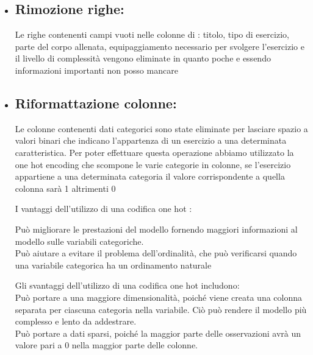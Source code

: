 \documentclass{book}
\begin{document}
\begin{itemize}
\item \subsection{ Rimozione righe:}\newline

Le righe contenenti campi vuoti nelle colonne di : titolo, tipo di esercizio, parte del corpo allenata, equipaggiamento necessario per svolgere l’esercizio e il livello di complessità vengono eliminate in quanto poche e essendo informazioni importanti non posso mancare\newline
\newpage
\item \subsection{ Riformattazione colonne:}\newline

Le colonne contenenti dati categorici sono state eliminate per lasciare spazio a valori binari che indicano l'appartenza di un esercizio a una determinata caratteristica. Per poter effettuare questa operazione abbiamo utilizzato la one hot encoding che scompone le varie categorie in colonne, se l'esercizio appartiene a una determinata categoria il valore corrispondente a quella colonna sarà 1 altrimenti 0 \newline


I vantaggi dell'utilizzo di una codifica one hot :\newline

Può migliorare le prestazioni del modello fornendo maggiori informazioni al modello sulle variabili categoriche.\\
Può aiutare a evitare il problema dell’ordinalità, che può verificarsi quando una variabile categorica ha un ordinamento naturale\newline

Gli svantaggi dell'utilizzo di una codifica one hot includono:\\

Può portare a una maggiore dimensionalità, poiché viene creata una colonna separata per ciascuna categoria nella variabile. Ciò può rendere il modello più complesso e lento da addestrare.\\
 Può portare a dati sparsi, poiché la maggior parte delle osservazioni avrà un valore pari a 0 nella maggior parte delle colonne.\newline


\end{itemize}
\end{document}
